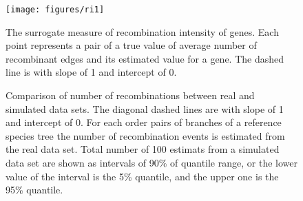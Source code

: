 \documentclass[english]{article}
\begin{document}
\begin{figure}
\texttt{[image: figures/ri1]}
\caption{\label{fig:ri1}The surrogate measure of recombination intensity
of genes. Each point represents a pair of a true value of average number of
recombinant edges and its estimated value for a gene. The dashed line is with
slope of 1 and intercept of 0.}
\end{figure}
\clearpage{}%

\begin{figure}


\caption{\label{fig:h2}Comparison of number of recombinations between real
and simulated data sets. The diagonal dashed lines are with
slope of 1 and intercept of 0. For each order pairs of branches of
a reference species tree the number of recombination events is estimated
from the real data set. Total number of 100 estimats from a simulated
data set are shown as intervals of 90\% of quantile range, or the
lower value of the interval is the 5\% quantile, and the upper one
is the 95\% quantile. }
\end{figure}
\clearpage{}%

\clearpage
\end{document}

